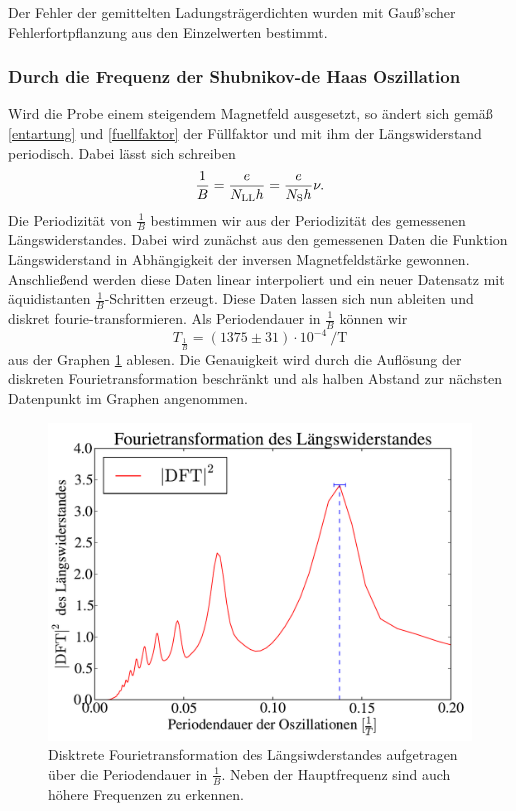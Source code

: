 \documentclass[paper=a4,fontsize=10pt,DIV=18,twocolumn,parskip=half]{scrartcl}
\numberwithin{equation}{section}    %
\begin{document}
Der Fehler der gemittelten Ladungsträgerdichten wurden mit Gauß'scher Fehlerfortpflanzung aus den Einzelwerten bestimmt.\\

\subsubsection*{Durch die Frequenz der Shubnikov-de Haas Oszillation}
Wird die Probe einem steigendem Magnetfeld ausgesetzt, so ändert sich gemäß \eqref{entartung} und \eqref{fuellfaktor} der Füllfaktor und mit ihm der Längswiderstand periodisch. Dabei lässt sich schreiben
\begin{equation}
\frac{1}{B}=\frac{e}{N_{\rm LL} h}=\frac{e}{N_\mathrm{S} h} \nu.
\end{equation}
Die Periodizität von $\frac{1}{B}$ bestimmen wir aus der Periodizität des gemessenen Längswiderstandes. Dabei wird zunächst aus den gemessenen Daten die Funktion Längswiderstand in Abhängigkeit der inversen Magnetfeldstärke gewonnen. Anschließend werden diese Daten linear interpoliert und ein neuer Datensatz mit äquidistanten $\frac{1}{B}$-Schritten erzeugt. Diese Daten lassen sich nun ableiten und diskret fourie-transformieren. Als Periodendauer in $\frac{1}{B}$ können wir
\begin{equation}
T_{\frac{1}{B}}=(1375\pm 31) \cdot 10^{-4}\SI{}{\per\tesla}
\label{periodizitaet}
\end{equation}
aus der Graphen \ref{fft} ablesen. Die Genauigkeit wird durch die Auflösung der diskreten Fourietransformation beschränkt und als halben Abstand zur nächsten Datenpunkt im Graphen angenommen.

\begin{figure}[]
	\begin{center}
		\includegraphics[width=\columnwidth]{Data-Plots/06-Fourietransformation.pdf}
		\caption{Disktrete Fourietransformation des Längsiwderstandes aufgetragen über die Periodendauer in $\frac{1}{B}$. Neben der Hauptfrequenz sind auch höhere Frequenzen zu erkennen.}
		\label{fft}
	\end{center}
\end{figure}
\end{document}
